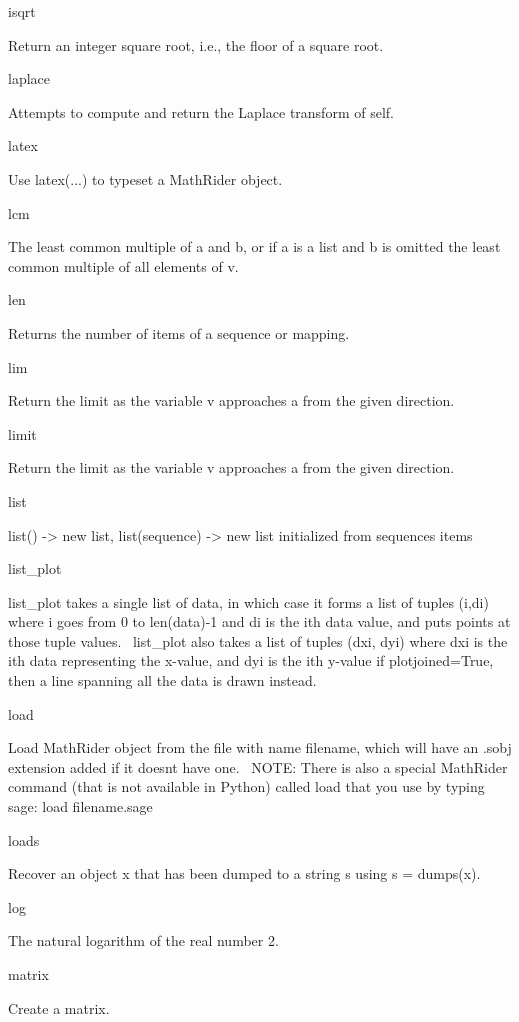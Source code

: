 \documentclass[12pt,twoside]{book}
\begin{document}
\bigskip

isqrt

Return an integer square root, i.e., the floor of a square root.

laplace

Attempts to compute and return the Laplace transform of self.

latex

Use latex(...) to typeset a MathRider object.

lcm

The least common multiple of a and b, or if a is a list and b is omitted
the least common multiple of all elements of v.

len

Returns the number of items of a sequence or mapping.

lim

Return the limit as the variable v approaches a from the given
direction.

limit

Return the limit as the variable v approaches a from the given
direction.

list

list() {}-{\textgreater} new list, list(sequence) {}-{\textgreater} new
list initialized from sequence{\textquotesingle}s items

list\_plot

list\_plot takes a single list of data, in which case it forms a list of
tuples (i,di) where i goes from 0 to len(data){}-1 and di is the ith
data value, and puts points at those tuple values. \ list\_plot also
takes a list of tuples (dxi, dyi) where dxi is the ith data
representing the x{}-value, and dyi is the ith y{}-value if
plotjoined=True, then a line spanning all the data is drawn instead.

load

Load MathRider object from the file with name filename, which will have
an .sobj extension added if it doesn{\textquotesingle}t have one.
\ NOTE: There is also a special MathRider command (that is not
available in Python) called load that you use by typing sage: load
filename.sage

loads

Recover an object x that has been dumped to a string s using s =
dumps(x).

log

The natural logarithm of the real number 2.

matrix

Create a matrix.
\end{document}
